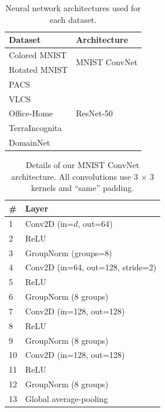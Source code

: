 \documentclass{article}
\begin{document}
\begin{minipage}{0.45\textwidth}
    \begin{table}[H]
    \caption{Neural network architectures used for each dataset.} 
        \begin{tabular}{ll}
        \toprule
        \textbf{Dataset} & \textbf{Architecture} \\
        \midrule
        Colored MNIST & \multirow{2}{*}{MNIST ConvNet} \\
        Rotated MNIST & \\
        \midrule
        PACS & \multirow{5}{*}{ResNet-50} \\
        VLCS & \\
        Office-Home &  \\
        TerraIncognita &  \\
        DomainNet &  \\
        \bottomrule
        \end{tabular}
\label{table:architectures}
\end{table}
\end{minipage}
\hfill
\begin{minipage}{0.48\textwidth}
\begin{table}[H]
    \caption{Details of our MNIST ConvNet architecture. All convolutions use 3 $\times$ 3 kernels and ``same'' padding.} 
        \begin{tabular}{ll}
        \toprule
        \textbf{\#} & \textbf{Layer}\\
        \midrule
            1  & Conv2D (in=$d$, out=64)\\
            2  & ReLU\\
            3  & GroupNorm (groups=8)\\
            4  & Conv2D (in=64, out=128, stride=2)\\
            5  & ReLU\\
            6  & GroupNorm (8 groups)\\
            7  & Conv2D (in=128, out=128)\\
            8  & ReLU\\
            9  & GroupNorm (8 groups)\\
            10 & Conv2D (in=128, out=128)\\
            11 & ReLU\\
            12 & GroupNorm (8 groups)\\
            13 & Global average-pooling\\
        \bottomrule
        \end{tabular}
\label{table:mnist_convnet}
\end{table}
\end{minipage}
\end{document}

